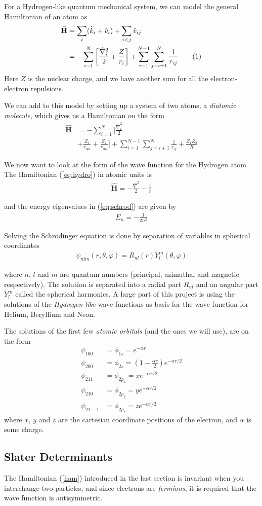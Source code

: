 \documentclass[twocolumns, a4paper,11pt,fleqn]{extarticle}
\newcommand{\eq}[1]{{\small\begin{align*}#1\end{align*}}}
\newcommand{\equ}[1]{{\small\begin{align}#1\end{align}}}
\newcommand\numberthis{\addtocounter{equation}{1}\tag{\theequation}}
\newcommand{\OP}[1]{\mathbf{\widehat{#1}}}
\newcommand{\op}[1]{\hat{#1}}
\begin{document}
For a Hydrogen-like quantum mechanical system, we can model the general
Hamiltonian of an atom as
\eq{
  \OP H
  &=\sum_i (\op k_i + \op v_i)  + \sum_{i<j} \op v_{ij}\\
  &= -\sum_{i=1}^N\bigg[
    \frac{\op\nabla_i^2}{2} + \frac{Z}{r_i}\bigg] 
  + \sum_{i=1}^{N-1}\sum_{j=i+1}^N\frac{1}{r_{ij}} \numberthis\label{ham}
}
Here $Z$ is the nuclear charge, 
and we have another sum for all the electron-electron repulsions.

We can add to this model by setting up a system of two atoms,
a \textit{diatomic molecule}, which gives us a Hamiltonian on the form
\eq{
  \OP H &= -\sum_{i=1}^N\bigg[
    \frac{\op\nabla_i^2}{2}\\ &+ \frac{Z_1}{r_{ip1}} + \frac{Z_2}{r_{ip2}}\bigg] 
    + \sum_{i=1}^{N-1}\sum_{j=i+1}^N\frac{1}{r_{ij}} + \frac{Z_1 Z_2}{R}
}

We now want to look at the form of the wave function for the Hydrogen atom.
The Hamiltonian (\ref{eq:hydro}) in atomic units is
\eq{
  \OP H = -\frac{\op \nabla^2}{2}- \frac{1}{r}
}

and the energy eigenvalues in (\ref{eq:schrod}) are given by
\eq{
  E_n = -\frac{1}{2n^2}
}

Solving the Schr\"odinger equation is done by separation of variables in
spherical coordinates
\equ{
  \psi_{nlm}(r,\theta,\varphi) = R_{nl}(r) Y_l^{m}(\theta,\varphi)\label{eq:psi}
}

where $n$, $l$ and $m$ are quantum numbers 
(principal, azimuthal and magnetic respectively).
The solution is separated into a radial part $R_{nl}$ and an angular part $Y_l^{m}$
called the spherical harmonics.
A large part of this project is using the solutions of the \textit{Hydrogen-like}
wave functions as basis for the wave function for Helium, Beryllium and Neon.

The solutions of the first few \textit{atomic orbitals} (and the ones we will use), 
are on the form
\eq{
  \psi_{100} &= \phi_{1s} =  e^{-\alpha r}\\
  \psi_{200} &= \phi_{2s} =  \left(1-\frac{\alpha r}{2}\right)e^{-\alpha r/2} \\
  \psi_{211} &= \phi_{2p_x} = x e^{-\alpha r/2}\\
  \psi_{210} &= \phi_{2p_y} = y e^{-\alpha r/2}\\
  \psi_{21-1}&= \phi_{2p_z} = z e^{-\alpha r/2}
}
where $x$, $y$ and $z$ are the cartesian coordinate positions of the electron,
and $\alpha$ is some charge.

\subsection{Slater Determinants}
The Hamiltonian (\ref{ham}) introduced in the last section is invariant
when you interchange two particles, and since electrons are \textit{fermions},
it is required that the wave function is antisymmetric.
\end{document}
